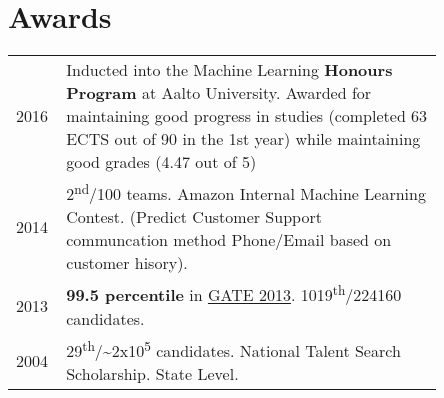 \documentclass[]{deedy-resume}
\begin{document}
\begin{minipage}[t]{0.66\textwidth}
\section{Awards} 
\begin{tabular}{p{0.05\linewidth}p{0.8\linewidth}}
    2016  & Inducted into the Machine Learning \textbf{Honours Program} at Aalto University. Awarded for maintaining good progress in studies (completed 63 ECTS out of 90 in the 1st year) while maintaining good grades (4.47 out of 5)\\ 
2014  & 2\textsuperscript{nd}/100 teams. Amazon Internal Machine Learning Contest. (Predict Customer Support communcation method {Phone/Email} based on customer hisory). \\
2013  & \textbf{99.5 percentile}  in \href{http://www.gate.iitb.ac.in/gate2013/cs-syllabus/}{GATE 2013}. 1019\textsuperscript{th}/224160 candidates.\\
2004  & 29\textsuperscript{th}/\textasciitilde2x10\textsuperscript{5} candidates. National Talent Search Scholarship. State Level.\\

\end{tabular}
\sectionsep


% 



\end{minipage} 
\end{document}
